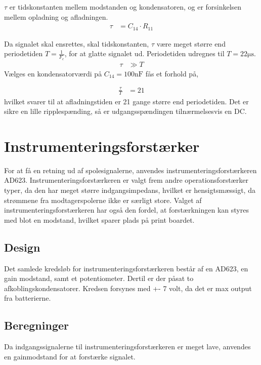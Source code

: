 $\tau$ er tidskonstanten mellem modstanden og kondensatoren, og er forsinkelsen mellem opladning og afladningen. 
\begin{align}
		\tau & = C_{14} \cdot R_{11}
\end{align}

Da signalet skal ensrettes, skal tidskonstanten, $\tau$ være meget større end periodetiden $T = \frac{1}{F_c}$, for at glatte signalet ud. Periodetiden udregnes til $T = 22 \si{\micro\second}$.
\begin{align}
		\tau & \gg T \nonumber
\end{align}
Vælges en kondensatorværdi på $C_{14} = 100 \si{\nano\farad}$ fås et forhold på,

\begin{align}
	\frac{\tau}{T} & = 21
\end{align}
hvilket svarer til at afladningstiden er 21 gange større end periodetiden. Det er sikre en lille ripplespænding, så er udgangsspændingen tilnærmelsesvis en DC.

\section{Instrumenteringsforstærker}
For at få en retning ud af spolesignalerne, anvendes instrumenteringsforstærkeren AD623. Instrumenteringsforstærkeren er valgt frem andre operationsforstærker typer, da den har meget større indgangsimpedans, hvilket er hensigtsmæssigt, da strømmene fra modtagerspolerne ikke er særligt store. Valget af instrumenteringsforstærkeren har også den fordel, at forstærkningen kan styres med blot en modstand, hvilket sparer plads på print boardet.


\subsection{Design}
Det samlede kredsløb for instrumenteringsforstærkeren består af en AD623, en gain modstand, samt et potentiometer. Dertil er der påsat to afkoblingskondensatorer. Kredsen forsynes med +- 7 volt, da det er max output fra batterierne. 


\subsection{Beregninger}
Da indgangssignalerne til instrumenteringsforstærkeren er meget lave, anvendes en gainmodstand for at forstærke signalet.

